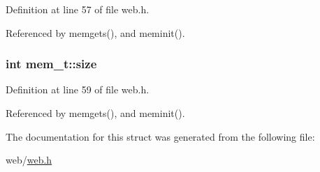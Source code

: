 Definition at line 57 of file web.\+h.



Referenced by memgets(), and meminit().

\subsubsection[{\texorpdfstring{size}{size}}]{\setlength{\rightskip}{0pt plus 5cm}int mem\+\_\+t\+::size}\hypertarget{structmem__t_ab04d46fb2982c9a26a26244286c1b33b}{}\label{structmem__t_ab04d46fb2982c9a26a26244286c1b33b}


Definition at line 59 of file web.\+h.



Referenced by memgets(), and meminit().



The documentation for this struct was generated from the following file\+:\begin{DoxyCompactItemize}
\item 
web/\hyperlink{web_8h}{web.\+h}\end{DoxyCompactItemize}
